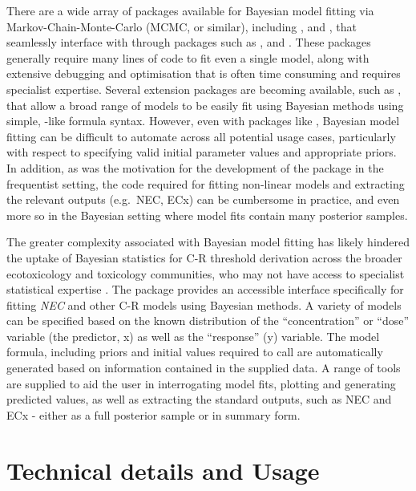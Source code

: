 \documentclass[
]{jss}
\begin{document}
There are a wide array of packages available for Bayesian model fitting
via Markov-Chain-Monte-Carlo (MCMC, or similar), including
 \citep{Lunn2000},  \citep{Plummer2003}
and  \citep{Carpenter2017}, that seamlessly interface
with  through packages such as , 
\citep{Su2015} and  \citep{rstan2020}. These packages
generally require many lines of code to fit even a single model, along
with extensive debugging and optimisation that is often time consuming
and requires specialist expertise. Several extension packages are
becoming available, such as  \citep{Burkner2017}, that allow a
broad range of models to be easily fit using Bayesian methods using
simple, -like formula syntax. However, even with packages like
, Bayesian model fitting can be difficult to automate across
all potential usage cases, particularly with respect to specifying valid
initial parameter values and appropriate priors. In addition, as was the
motivation for the development of the  package in the
frequentist setting, the  code required for fitting
non-linear models and extracting the relevant outputs (e.g.~NEC, ECx)
can be cumbersome in practice, and even more so in the Bayesian setting
where model fits contain many posterior samples.

The greater complexity associated with Bayesian model fitting has likely
hindered the uptake of Bayesian statistics for C-R threshold derivation
across the broader ecotoxicology and toxicology communities, who may not
have access to specialist statistical expertise \citep{Fisher2019}. The
 package provides an accessible interface specifically for
fitting \emph{NEC} and other C-R models using Bayesian methods. A
variety of models can be specified based on the known distribution of
the ``concentration'' or ``dose'' variable (the predictor, x) as well as
the ``response'' (y) variable. The model formula, including priors and
initial values required to call  are automatically generated
based on information contained in the supplied data. A range of tools
are supplied to aid the user in interrogating model fits, plotting and
generating predicted values, as well as extracting the standard outputs,
such as NEC and ECx - either as a full posterior sample or in summary
form.

\hypertarget{technical-details-and-usage}{%
\section{Technical details and
Usage}\label{technical-details-and-usage}}
\end{document}
